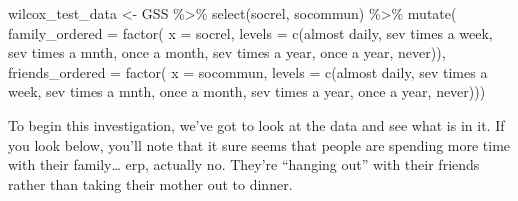 \documentclass[
]{book}
\newenvironment{Shaded}{\begin{snugshade}}{\end{snugshade}}
\newcommand{\AttributeTok}[1]{\textcolor[rgb]{0.77,0.63,0.00}{#1}}
\newcommand{\FunctionTok}[1]{\textcolor[rgb]{0.00,0.00,0.00}{#1}}
\newcommand{\NormalTok}[1]{#1}
\newcommand{\OtherTok}[1]{\textcolor[rgb]{0.56,0.35,0.01}{#1}}
\newcommand{\SpecialCharTok}[1]{\textcolor[rgb]{0.00,0.00,0.00}{#1}}
\newcommand{\StringTok}[1]{\textcolor[rgb]{0.31,0.60,0.02}{#1}}
\theoremstyle{definition}
\theoremstyle{definition}
\theoremstyle{definition}
\theoremstyle{definition}
\theoremstyle{remark}
\begin{document}
\begin{Shaded}
\begin{Highlighting}[]
\NormalTok{wilcox\_test\_data }\OtherTok{\textless{}{-}}\NormalTok{ GSS }\SpecialCharTok{\%\textgreater{}\%} 
  \FunctionTok{select}\NormalTok{(socrel, socommun) }\SpecialCharTok{\%\textgreater{}\%}
  \FunctionTok{mutate}\NormalTok{(}
    \AttributeTok{family\_ordered =} \FunctionTok{factor}\NormalTok{(}
      \AttributeTok{x      =}\NormalTok{ socrel, }
      \AttributeTok{levels =} \FunctionTok{c}\NormalTok{(}\StringTok{\textquotesingle{}almost daily\textquotesingle{}}\NormalTok{, }\StringTok{\textquotesingle{}sev times a week\textquotesingle{}}\NormalTok{, }
                 \StringTok{\textquotesingle{}sev times a mnth\textquotesingle{}}\NormalTok{, }\StringTok{\textquotesingle{}once a month\textquotesingle{}}\NormalTok{,}
                 \StringTok{\textquotesingle{}sev times a year\textquotesingle{}}\NormalTok{, }\StringTok{\textquotesingle{}once a year\textquotesingle{}}\NormalTok{, }\StringTok{\textquotesingle{}never\textquotesingle{}}\NormalTok{)),}
    \AttributeTok{friends\_ordered =} \FunctionTok{factor}\NormalTok{(}
      \AttributeTok{x      =}\NormalTok{ socommun, }
      \AttributeTok{levels =} \FunctionTok{c}\NormalTok{(}\StringTok{\textquotesingle{}almost daily\textquotesingle{}}\NormalTok{, }\StringTok{\textquotesingle{}sev times a week\textquotesingle{}}\NormalTok{, }
                 \StringTok{\textquotesingle{}sev times a mnth\textquotesingle{}}\NormalTok{, }\StringTok{\textquotesingle{}once a month\textquotesingle{}}\NormalTok{,}
                 \StringTok{\textquotesingle{}sev times a year\textquotesingle{}}\NormalTok{, }\StringTok{\textquotesingle{}once a year\textquotesingle{}}\NormalTok{, }\StringTok{\textquotesingle{}never\textquotesingle{}}\NormalTok{))) }
\end{Highlighting}
\end{Shaded}

To begin this investigation, we've got to look at the data and see what is in it. If you look below, you'll note that it sure seems that people are spending more time with their family\ldots{} erp, actually no. They're ``hanging out'' with their friends rather than taking their mother out to dinner.
\end{document}
